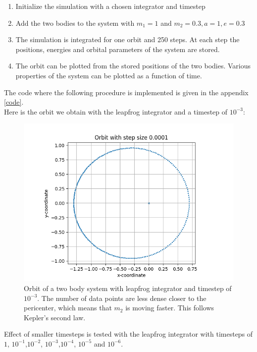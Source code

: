 \documentclass[12pt,a4paper]{article}
\begin{document}
\begin{enumerate}
  \item Initialize the simulation with a chosen integrator and timestep
  \item Add the two bodies to the system with $m_1 = 1$ and $m_2 = 0.3, a=1, e=0.3 $
  \item The simulation is integrated for one orbit and 250 steps. At each step the positions, energies and orbital parameters of the system are stored.
  \item The orbit can be plotted from the stored positions of the two bodies. Various properties of the system can be plotted as a function of time.
\end{enumerate}
The code where the following procedure is implemented is given in the appendix \ref{code}.\\
Here is the orbit we obtain with the leapfrog integrator and a timestep of $10^{-3}$:
\begin{figure}[H]
  \centering
  \includegraphics[width=\textwidth]{2Body/2BD0.png}
  \caption{Orbit of a two body system with leapfrog integrator and timestep of $10^{-3}$. The number of data points are less dense closer to the pericenter, which means that $m_2$ is moving faster. This follows Kepler's second law.}
  \label{fig:leapfrog_1e-3}
\end{figure}
Effect of smaller timesteps is tested with the leapfrog integrator with timesteps of $1$, $10^{-1}$,$10^{-2}$, $10^{-3}$,$10^{-4}$, $10^{-5}$ and $10^{-6}$.\\
\end{document}
